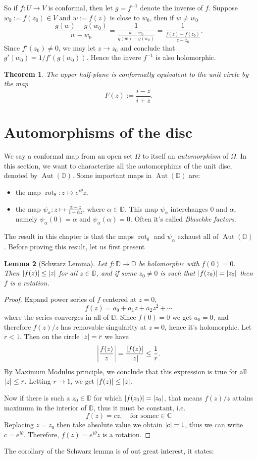 \documentclass{article}
\DeclarePairedDelimiter\abs{\lvert}{\rvert}
\theoremstyle{plain}
\newtheorem{theorem}{Theorem}
\newtheorem{lemma}[theorem]{Lemma}
\theoremstyle{remark}
\DeclareMathOperator{\Aut}{Aut}
\DeclareMathOperator{\rot}{rot}
\def\inv{^{-1}}
\def\D{\mathbb{D}}
\def\C{\mathbb{C}}
\begin{document}
So if $f:U\to V$ is conformal, then let $g=f\inv$ denote the inverse of $f$.
Suppose $w_0:=f(z_0)\in V$ and $w:=f(z)$ is close to $w_0$, then if $w\neq w_0$
\[
  \frac{g(w)-g(w_0)}{w-w_0}
  =\frac1{\frac{w-w_0}{g(w)-g(w_0)}}
  =\frac1{\frac{f(z)-f(z_0)}{z-z_0}}.
\]
Since $f'(z_0)\neq 0$, we may let $z\to z_0$ and conclude that $g'(w_0)=1/f'(g(w_0))$.
Hence the invere $f\inv$ is also holomorphic.

\noindent\hrulefill
\begin{theorem}
  The upper half-plane is conformally equivalent to the unit circle by the map
  \[F(z):=\frac{i-z}{i+z}.\]
\end{theorem}
\noindent\hrulefill

\section{Automorphisms of the disc}
We say a conformal map from an open set $\Omega$ to itself an \emph{automorphism}
of $\Omega$. In this section, we want to characterize all the automorphims of the unit disc,
denoted by $\Aut(\D)$. Some important maps in $\Aut(\D)$ are:
\begin{itemize}
\item the map $\rot_{\theta}: z\mapsto e^{i\theta}z$.
\item the map $\psi_{\alpha}: z\mapsto \frac{\alpha-z}{1-\overline{\alpha}z}$, where $\alpha\in\D$.
  This map $\psi_\alpha$ interchanges $0$ and $\alpha$, namely
  $\psi_\alpha(0)=\alpha$ and $\psi_\alpha(\alpha)=0$. Often it's called \emph{Blaschke factors}.
\end{itemize}
The result in this chapter is that the maps $\rot_\theta$ and $\psi_\alpha$ exhaust all of $\Aut(\D)$.
Before proving this result, let us first present

\noindent\hrulefill
\begin{lemma}[Schwarz Lemma]
  Let $f:\D\to\D$ be holomorphic with $f(0)=0$. Then $\abs{f(z)}\leq\abs{z}$ for all $z\in\D$,
  and if some $z_0\neq 0$ is such that $\abs{f(z_0)}=\abs{z_0}$ then $f$ is a rotation.
\end{lemma}
\noindent\hrulefill
\begin{proof}
  Expand power series of $f$ centered at $z=0$,
  \[f(z)=a_0+a_1z+a_2z^2+\cdots\]
  where the series converges in all of $\D$. Since $f(0)=0$ we get $a_0=0$, and therefore
  $f(z)/z$ has removable singularity at $z=0$, hence it's holomorphic.
  Let $r<1$. Then on the circle $\abs{z}=r$ we have
  \[
    \abs*{\frac{f(z)}{z}}=\frac{\abs{f(z)}}{\abs{z}}\leq\frac{1}{r}.
  \]
  By Maximum Modulus principle, we conclude that this expression is true for all
  $\abs{z}\leq r$. Letting $r\to 1$, we get $\abs{f(z)}\leq \abs{z}$.

  Now if there is such a $z_0\in\D$ for which $\abs{f(z_0)}=\abs{z_0}$, that means
  $f(z)/z$ attains maximum in the interior of $\D$, thus it must be constant, i.e.
  \[
    f(z)=cz,\quad\text{for some}c\in\C
  \]
  Replacing $z=z_0$ then take absolute value we obtain $\abs{c}=1$, thus we can write
  $c=e^{i\theta}$. Therefore, $f(z)=e^{i\theta}z$ is a rotation.
\end{proof}
The corollary of the Schwarz lemma is of out great interest, it states:
\end{document}
